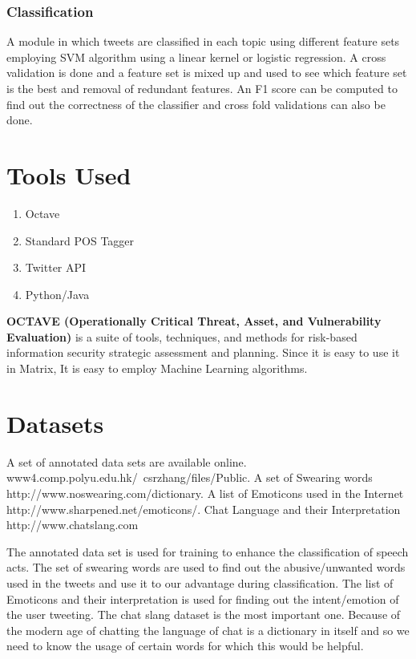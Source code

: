 \documentclass[conference]{IEEEtran}
\begin{document}
\subsubsection{\textbf{Classification}}
\par A module in which tweets are classified in each topic using different feature sets employing SVM algorithm using a linear kernel or logistic regression. A cross validation is done and a feature set is mixed up and used to see which feature set is the best and removal of redundant features. An F1 score can be computed to find out the correctness of the classifier and cross fold validations can also be done.

\section{\textbf{Tools Used}}

\begin{enumerate}
\item{Octave}
\item{Standard POS Tagger}
\item{Twitter API}
\item{Python/Java}
\end{enumerate}
 \par \textbf{OCTAVE (Operationally Critical Threat, Asset, and Vulnerability Evaluation)} is a suite of tools, techniques, and methods for risk-based information security strategic assessment and planning. Since it is easy to use it in Matrix, It is easy to employ Machine Learning algorithms.

\section{\textbf{Datasets}}
\par A set of annotated data sets are available online.
www4.comp.polyu.edu.hk/~csrzhang/files/Public.
A set of Swearing words
http://www.noswearing.com/dictionary.
A list of Emoticons used in the Internet
http://www.sharpened.net/emoticons/.
Chat Language and their Interpretation
http://www.chatslang.com
 
 \par The annotated data set is used for training to enhance the classification of speech acts. The set of swearing words are used to find out the abusive/unwanted words used in the tweets and use it to our advantage during classification. The list of Emoticons and their interpretation is used for finding out the intent/emotion of the user tweeting. The chat slang dataset is the most important one. Because of the modern age of chatting the language of chat is a dictionary in itself and so we need to know the usage of certain words for which this would be helpful.
\end{document}
